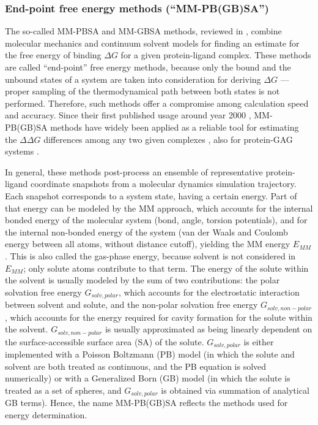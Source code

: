 \subsubsection{End-point free energy methods (\enquote{MM-PB(GB)SA})}
\label{methods:mmpbsa_mmgbsa}

The so-called MM-PBSA and MM-GBSA methods, reviewed in
\cite{schlick_innovationsdynamics_mmpbsa_2012}, combine molecular mechanics and
continuum solvent models for finding an estimate for the free energy of binding
$\Delta G$ for a given protein-ligand complex. These methods are called
\enquote{end-point} free energy methods, because only the bound and the unbound
states of a system are taken into consideration for deriving $\Delta G$ ---
proper sampling of the thermodynamical path between both states is not
performed. Therefore, such methods offer a compromise among calculation speed
and accuracy. Since their first published usage around year 2000
\cite{srinivasan_mmpbsa_1998, kollmann_massova_mmpbsa_2000}, MM-PB(GB)SA methods
have widely been applied as a reliable tool for estimating the $\Delta \Delta G$
differences among any two given complexes \cite{mmgbsa_application_2010,
mmpbsa_hiv_2011}, also for protein-GAG systems \cite{mancera_mmpbsa_gags_2009}.

In general, these methods post-process an ensemble of representative
protein-ligand coordinate snapshots from a molecular dynamics simulation
trajectory. Each snapshot corresponds to a system state, having a certain
energy. Part of that energy can be modeled by the MM approach, which accounts
for the internal bonded energy of the molecular system (bond, angle, torsion
potentials), and for the internal non-bonded energy of the system (van der Waals
and Coulomb energy between all atoms, without distance cutoff), yielding the MM
energy $E_{MM}$. This is also called the gas-phase energy, because solvent is
not considered in $E_{MM}$; only solute atoms contribute to that term. The
energy of the solute within the solvent is usually modeled by the sum of two
contributions: the polar solvation free energy $G_{solv,polar}$, which accounts
for the electrostatic interaction between solvent and solute, and the non-polar
solvation free energy $G_{solv,non-polar}$, which accounts for the energy
required for cavity formation for the solute within the solvent.
$G_{solv,non-polar}$ is usually approximated as being linearly dependent on the
surface-accessible surface area (SA) of the solute. $G_{solv,polar}$ is either
implemented with a Poisson Boltzmann (PB) model (in which the solute and solvent
are both treated as continuous, and the PB equation is solved numerically) or
with a Generalized Born (GB) model (in which the solute is treated as a set of
spheres, and $G_{solv,polar}$ is obtained via summation of analytical GB terms).
Hence, the name MM-PB(GB)SA reflects the methods used for energy determination.

